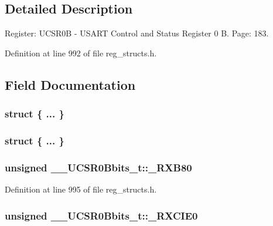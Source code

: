 \subsection{Detailed Description}
Register\+: U\+C\+S\+R0\+B -\/ U\+S\+A\+R\+T Control and Status Register 0 B. Page\+: 183. 

Definition at line 992 of file reg\+\_\+structs.\+h.



\subsection{Field Documentation}
\hypertarget{union_____u_c_s_r0_bbits__t_aac667f4ee767ecacc835ca2ecc347079}{\subsubsection[{"@241}]{\setlength{\rightskip}{0pt plus 5cm}struct \{ ... \} }}\label{union_____u_c_s_r0_bbits__t_aac667f4ee767ecacc835ca2ecc347079}
\hypertarget{union_____u_c_s_r0_bbits__t_a313bd33fc975f00c1e05dea234c89b53}{\subsubsection[{"@243}]{\setlength{\rightskip}{0pt plus 5cm}struct \{ ... \} }}\label{union_____u_c_s_r0_bbits__t_a313bd33fc975f00c1e05dea234c89b53}
\hypertarget{union_____u_c_s_r0_bbits__t_a98719da01be606bad49b3796a6ac4880}{
\subsubsection[{\+\_\+\+R\+X\+B80}]{\setlength{\rightskip}{0pt plus 5cm}unsigned \+\_\+\+\_\+\+U\+C\+S\+R0\+Bbits\+\_\+t\+::\+\_\+\+R\+X\+B80}}\label{union_____u_c_s_r0_bbits__t_a98719da01be606bad49b3796a6ac4880}


Definition at line 995 of file reg\+\_\+structs.\+h.

\hypertarget{union_____u_c_s_r0_bbits__t_a0d5eb83523ba002e49816db517b4505e}{
\subsubsection[{\+\_\+\+R\+X\+C\+I\+E0}]{\setlength{\rightskip}{0pt plus 5cm}unsigned \+\_\+\+\_\+\+U\+C\+S\+R0\+Bbits\+\_\+t\+::\+\_\+\+R\+X\+C\+I\+E0}}\label{union_____u_c_s_r0_bbits__t_a0d5eb83523ba002e49816db517b4505e}


